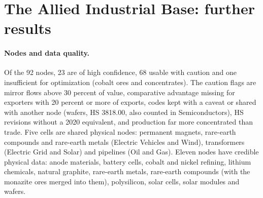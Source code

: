 \section{The Allied Industrial Base: further results}\label{oa:network}

\paragraph{Nodes and data quality.} Of the 92 nodes, 23 are of high confidence, 68 usable with
caution and one insufficient for optimization (cobalt ores and concentrates). The caution flags are
mirror flows above 30 percent of value, comparative advantage missing for exporters with 20 percent
or more of exports, codes kept with a caveat or shared with another node (wafers, HS 3818.00, also
counted in Semiconductors), HS revisions without a 2020 equivalent, and production far more
concentrated than trade. Five cells are shared physical nodes: permanent magnets, rare-earth compounds
and rare-earth metals (Electric Vehicles and Wind), transformers (Electric Grid and Solar) and pipelines
(Oil and Gas). Eleven nodes have credible physical data: anode materials, battery cells, cobalt and
nickel refining, lithium chemicals, natural graphite, rare-earth metals, rare-earth compounds (with the
monazite ores merged into them), polysilicon, solar cells, solar modules and wafers.

